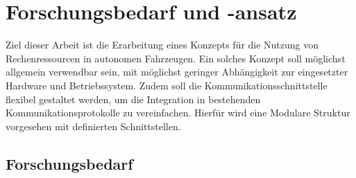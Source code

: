\chapter{Forschungsbedarf und -ansatz}

Ziel dieser Arbeit ist die Erarbeitung eines Konzepts für die Nutzung von Rechenressourcen in autonomen Fahrzeugen. Ein solches Konzept soll möglichst allgemein verwendbar sein, mit möglichst geringer Abhängigkeit zur eingesetzter Hardware und Betriebssystem. Zudem soll die Kommunikationsschnittstelle flexibel gestaltet werden, um die Integration in bestehenden Kommunikationsprotokolle zu vereinfachen. Hierfür wird eine Modulare Struktur vorgesehen mit definierten Schnittstellen. 

\section{Forschungsbedarf}